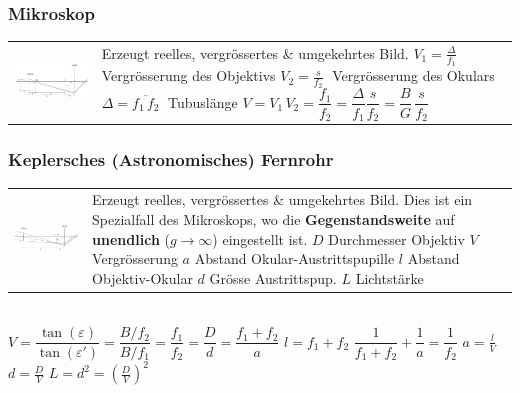\subsubsection{Mikroskop  }
\begin{tabular}{ll}
\parbox{8cm}{\includegraphics[width=8cm]{./bilder/mikroskop.png}}
	& \parbox{10cm}{
	Erzeugt reelles, vergrössertes \& umgekehrtes Bild. \\ \\
	$V_1 = \frac{\Delta}{f_1} \;$ Vergrösserung des Objektivs\\
	$V_2 = \frac{s}{f_2} \;$ Vergrösserung des Okulars \\\\
	$\Delta = \overline{f_1\,f_2} \;$ Tubuslänge \\ 
	$V=V_1\,V_2= \dfrac{f_1}{f_2} = 
	\dfrac{\Delta}{f_1}\dfrac{s}{f_2}=\dfrac{B}{G}\,\dfrac{s}{f_2}$ }
\end{tabular}

\subsubsection{Keplersches (Astronomisches) Fernrohr  }
\begin{tabular}{ll}
\parbox{11cm}{
	\includegraphics[width=10cm]{./bilder/astron.png}}
	& \parbox{7cm}{
	Erzeugt reelles, vergrössertes \& umgekehrtes Bild. Dies ist ein Spezialfall
	des Mikroskops, wo die \textbf{Gegenstandsweite} auf \textbf{unendlich} ($g \rightarrow \infty$) eingestellt
	ist. \\ \\ $D$ Durchmesser Objektiv \\ $V$ Vergrösserung\\
	$a$ Abstand Okular-Austrittspupille\\
	$l$ Abstand Objektiv-Okular\\
	$d$ Grösse Austrittspup.\\
	$L$ Lichtstärke
	}
\end{tabular}\\
$V=\dfrac{\tan(\varepsilon)}{\tan(\varepsilon')}=\dfrac{B/f_2}{B/f_1}=
	\dfrac{f_1}{f_2}=\dfrac{D}{d}=\dfrac{f_1+f_2}{a}$ \qquad $l=f_1+f_2$ \qquad
$\dfrac{1}{f_1+f_2}+\dfrac{1}{a}=\dfrac{1}{f_2}$ \qquad $a=\frac{l}{V} $ 
\qquad $d=\frac{D}{V}$ \qquad $L = d^2 = \left( \frac{D}{V} \right)^2$

